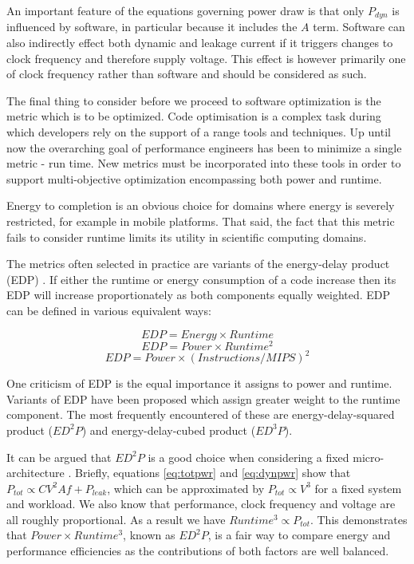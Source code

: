 An important feature of the equations governing power draw is that only $P_{dyn}$ is influenced by software, in particular because it includes the $A$ term. Software can also indirectly effect both dynamic and leakage current if it triggers changes to clock frequency and therefore supply voltage. This effect is however primarily one of clock frequency rather than software and should be considered as such.\golden

The final thing to consider before we proceed to software optimization is the metric which is to be optimized. Code optimisation is a complex task during which developers rely on the support of a range tools and techniques. Up until now the overarching goal of performance engineers has been to minimize a single metric - run time. New metrics must be incorporated into these tools in order to support multi-objective optimization encompassing both power and runtime. \golden

Energy to completion is an obvious choice for domains where energy is severely restricted, for example in mobile platforms. That said, the fact that this metric fails to consider runtime limits its utility in scientific computing domains.\golden

The metrics often selected in practice are variants of the energy-delay product (EDP) \cite{gonzales:1995aa}. If either the runtime or energy consumption of a code increase then its EDP will increase proportionately as both components equally weighted. EDP can be defined in various equivalent ways:\golden

\begin{equation}
EDP = Energy \times Runtime
\end{equation}
\begin{equation}
EDP = Power \times Runtime^{2}
\end{equation}
\begin{equation}
EDP = Power \times (Instructions / MIPS)^{2}
\end{equation}

One criticism of EDP is the equal importance it assigns to power and runtime. Variants of EDP have been proposed which assign greater weight to the runtime component. The most frequently encountered of these are  energy-delay-squared product ($ED^{2}P$) and energy-delay-cubed product ($ED^{3}P$). \golden


 It can be argued that $ED^{2}P$ is a good choice when considering a fixed micro-architecture \cite{brooks:2000aa}. Briefly, equations \ref{eq:totpwr} and \ref{eq:dynpwr} show that $P_{tot} \propto CV^{2}Af + P_{leak} $, which can be approximated by $P_{tot} \propto V^{3}$ for a fixed system and workload. We also know that performance, clock frequency and voltage are all roughly proportional. As a result we have $Runtime^{3} \propto P_{tot}$. This demonstrates that $Power \times Runtime^{3}$, known as $ED^{2}P$, is a fair way to compare energy and performance efficiencies as the contributions of both factors are well balanced. \golden